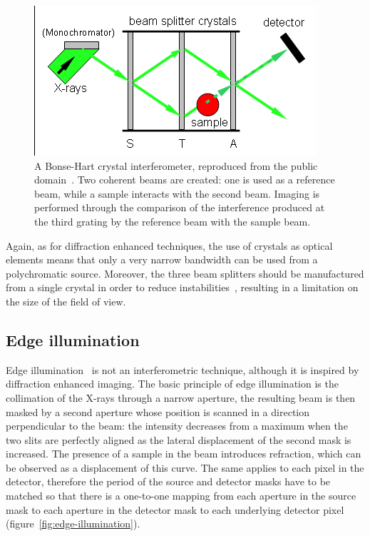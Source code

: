 \begin{figure}[htb]
    \centering
    \includegraphics[width=.7\textwidth]{gfx/Crystal_interferometer.png}
    \caption[Bonse-Hart interferometer.]{A Bonse-Hart crystal
        interferometer, reproduced from the public domain~\parencite{bonse-hart-picture}. Two coherent beams are created: one is used as a
reference beam, while a sample interacts with the second beam. Imaging is
performed through the
comparison of the interference produced at the third grating by the
reference beam with the sample beam.}
    \label{fig:bonse-hart}
\end{figure}

Again, as for diffraction enhanced techniques, the use of crystals as
optical elements means that only a very narrow bandwidth can be used from a
polychromatic source. Moreover, the three beam splitters should be
manufactured from a single crystal in order to reduce
instabilities~\parencite{1965ApPhL...7...99B},
resulting in a limitation on the size of the field of view.

\subsection{Edge illumination}
Edge illumination~\parencite{Olivo2001} is not an interferometric technique, although it is
inspired by diffraction enhanced imaging. The basic principle of edge
illumination is the collimation of the X-rays through a narrow aperture,
the resulting beam is then masked by a second aperture whose position is
scanned in a direction perpendicular to the beam: the intensity decreases from a
maximum when the two slits are perfectly aligned as the lateral displacement
of the second mask is increased.
The presence of a sample in the beam introduces refraction, which can be
observed as a displacement of this curve. The same applies to each pixel in
the detector, therefore the period of the source and detector masks have to
be matched so that there is a one-to-one mapping from each aperture in the
source mask to each aperture in the detector mask to each underlying
detector pixel (figure~\ref{fig:edge-illumination}).

